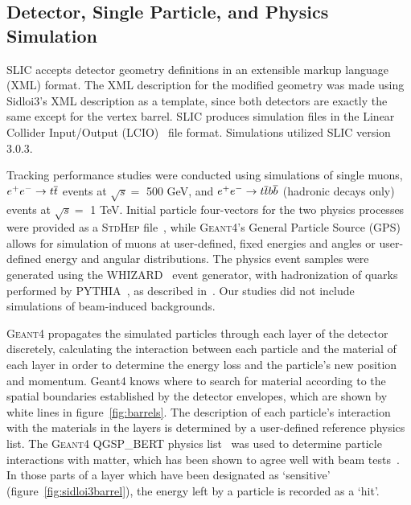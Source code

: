 \subsection{Detector, Single Particle, and Physics Simulation}
\label{sec:sim}
SLIC accepts detector geometry definitions in an extensible markup language (XML) format.
The XML description for the modified geometry was made using Sidloi3's XML
description as a template, since both detectors are exactly the same except for the vertex barrel.
SLIC produces simulation files in the Linear Collider Input/Output (LCIO)~\cite{2003physics...6114G} file format.
Simulations utilized SLIC version 3.0.3.

Tracking performance studies were conducted using simulations of single muons,
$\ee \rightarrow \ttbar$ events at $ \sqrt{s} = $ 500 GeV,
and $\ee \rightarrow \ttbar \bbbar$ (hadronic decays only) events at $ \sqrt{s} = $ 1 TeV.
Initial particle four-vectors for the two physics processes were provided as
a S\textsc{td}H\textsc{ep} file~\cite{stdhep:url},
while G\textsc{eant}4's General Particle Source (GPS)
allows for simulation of muons at user-defined, fixed energies and angles
or user-defined energy and angular distributions.
The physics event samples were generated using the WHIZARD~\cite{kilian2011whizard} event generator,
with hadronization of quarks performed by PYTHIA~\cite{sjostrand2006pythia},
as described in~\cite{Grefe:2014pba,Behnke:2013lya}.
Our studies did not include simulations of beam-induced backgrounds.

G\textsc{eant}4 propagates the simulated particles 
through each layer of the detector discretely, calculating the interaction between each particle and the material of each layer
in order to determine the energy loss and the particle's new position and momentum.
Geant4 knows where to search for material according to the spatial boundaries established by the detector
envelopes, which are shown by white lines in figure~\ref{fig:barrels}.
The description of each particle's interaction with the materials in the layers is determined
by a user-defined reference physics list.
The G\textsc{eant}4 QGSP\_BERT physics list~\cite{geant4physlist:url} was used to determine particle interactions with matter, which
 has been shown to agree well with beam tests~\cite{2008arXiv0808.0130P}.
In those parts of a layer which have been designated as `sensitive' (figure~\ref{fig:sidloi3barrel}),
the energy left by a particle is recorded as a `hit'.


